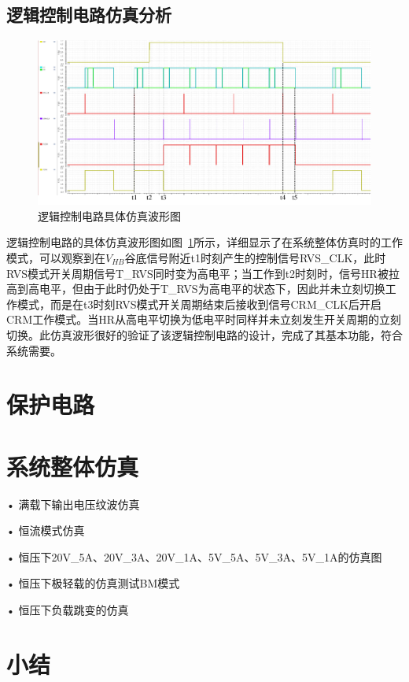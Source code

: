 \subsection{逻辑控制电路仿真分析}

\begin{figure}[htbp] 
    \centering
    \includegraphics[width=0.8\linewidth]{figures/逻辑控制波形2.pdf}
    \caption{逻辑控制电路具体仿真波形图}
    \label{fig:逻辑控制波形2}
\end{figure} 

逻辑控制电路的具体仿真波形图如图~\ref{fig:逻辑控制波形2}所示，详细显示了在系统整体仿真时的工作模式，可以观察到在$V_{HB}$谷底信号附近t1时刻产生的控制信号RVS\_CLK，此时RVS模式开关周期信号T\_RVS同时变为高电平；当工作到t2时刻时，信号HR被拉高到高电平，但由于此时仍处于T\_RVS为高电平的状态下，因此并未立刻切换工作模式，而是在t3时刻RVS模式开关周期结束后接收到信号CRM\_CLK后开启CRM工作模式。当HR从高电平切换为低电平时同样并未立刻发生开关周期的立刻切换。此仿真波形很好的验证了该逻辑控制电路的设计，完成了其基本功能，符合系统需要。


\section{保护电路}

\section{系统整体仿真}

• 满载下输出电压纹波仿真

• 恒流模式仿真

• 恒压下20V\_5A、20V\_3A、20V\_1A、5V\_5A、5V\_3A、5V\_1A的仿真图

• 恒压下极轻载的仿真测试BM模式

• 恒压下负载跳变的仿真



\section{小结}





